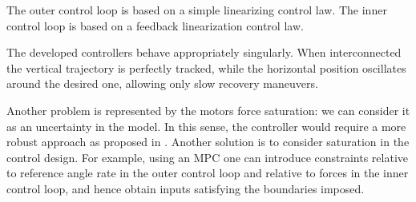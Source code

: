 \documentclass[11pt,a4paper]{scrartcl}
\begin{document}
The outer control loop is based on a simple linearizing control law. The inner control loop is based on a feedback linearization control law. 

The developed controllers behave appropriately singularly. When interconnected the vertical trajectory is perfectly tracked, while the horizontal position oscillates around the desired one, allowing only slow recovery maneuvers.

Another problem is represented by the motors force saturation: we can consider it as an uncertainty in the model. In this sense, the controller would require a more robust approach as proposed in \cite{lanzon2014flight}. Another solution is to consider saturation in the control design. For example, using an MPC one can introduce constraints relative to reference angle rate in the outer control loop and relative to forces in the inner control loop, and hence obtain inputs satisfying the boundaries imposed.

\clearpage




\end{document}
